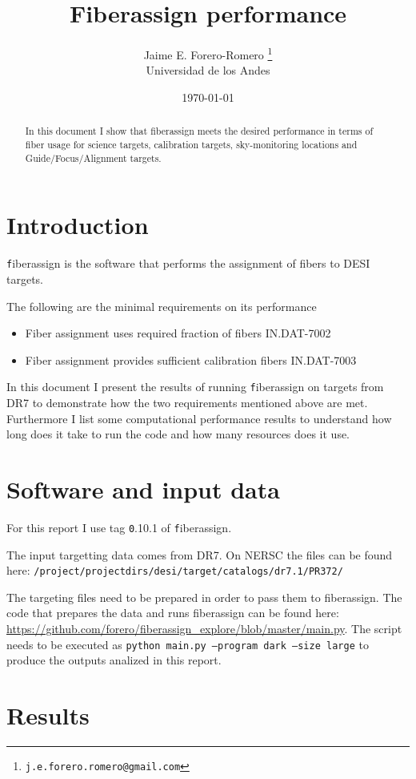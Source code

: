 \documentclass{article}
\title{Fiberassign performance}
\author{Jaime E. Forero-Romero \footnote{{\texttt{j.e.forero.romero@gmail.com}}}\\Universidad de los Andes}
\date{\today}
\begin{document}
\maketitle
\begin{abstract}
In this document I show that fiberassign meets the desired performance
in terms of fiber usage for science targets, calibration targets,
sky-monitoring locations and Guide/Focus/Alignment targets. 
\end{abstract}

\section{Introduction}
{\texttt fiberassign} is the software that performs the assignment of
fibers to DESI targets. 

The following are the minimal requirements on its performance
\begin{itemize}
\item Fiber assignment uses required fraction of fibers IN.DAT-7002
\item Fiber assignment provides sufficient calibration fibers IN.DAT-7003
\end{itemize}
In this document I present the results of running {\texttt
  fiberassign} on targets from DR7 to demonstrate how the two
requirements mentioned above are met. 
Furthermore I list some computational performance results to
understand how long does it take to run the code and how many
resources does it use.

\section{Software and input data}

For this report I use tag {\texttt 0.10.1} of {\texttt fiberassign}. 

The input targetting data comes from DR7. On NERSC the files can be found here:
{\texttt{/project/projectdirs/desi/target/catalogs/dr7.1/PR372/}}

The targeting files need to be prepared in order to pass them to
fiberassign.
The code that prepares the data and runs fiberassign can be found
here:
\url{https://github.com/forero/fiberassign_explore/blob/master/main.py}.
The script needs to be executed as {\texttt{python main.py --program dark
--size large}} to produce the outputs analized in this report.


\section{Results}
\end{document}
